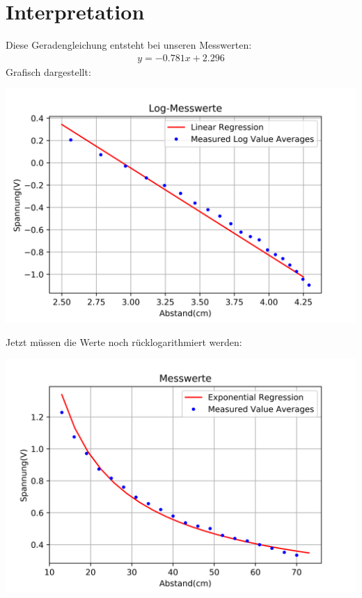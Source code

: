 \documentclass[12pt, oneside, a4paper, \docLanguage]{report}
\begin{document}
\section{Interpretation}
\label{chap:VERSUCH_2_INTERPRETATION}
\begin{normalsize}
Diese Geradengleichung entsteht bei unseren Messwerten:
\begin{align*}
y = -0.781x + 2.296
\end{align*}
Grafisch dargestellt:\\
\begin{minipage}{\linewidth}
\begin{center}
\includegraphics[scale=1]{LinearRegr.png}
\end{center}
\end{minipage}
\end{normalsize}
\newpage
\begin{normalsize}
Jetzt müssen die Werte noch rücklogarithmiert werden:\\
\begin{minipage}{\linewidth}
\begin{center}
\includegraphics[scale=1]{ExpRegr.png}
\end{center}
\end{minipage}
\end{normalsize}
%
%
\end{document}
